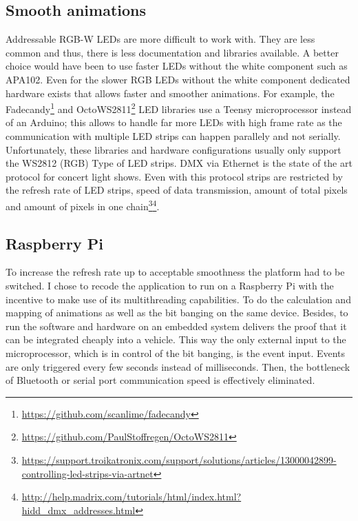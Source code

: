 \subsection{Smooth animations}
\label{ssec:smooth}
Addressable RGB-W LEDs are more difficult to work with. They are less common and thus, there is less documentation and libraries available. A better choice would have been to use faster LEDs without the white component such as APA102. Even for the slower RGB LEDs without the white component dedicated hardware exists that allows faster and smoother animations. For example, the Fadecandy\footnote{\url{https://github.com/scanlime/fadecandy}} and OctoWS2811\footnote{\url{https://github.com/PaulStoffregen/OctoWS2811}} LED libraries use a Teensy microprocessor instead of an Arduino; this allows to handle far more LEDs with high frame rate as the communication with multiple LED strips can happen parallely and not serially. Unfortunately, these libraries and hardware configurations usually only support the WS2812 (RGB) Type of LED strips. DMX via Ethernet is the state of the art protocol for concert light shows. Even with this protocol strips are restricted by the refresh rate of LED strips, speed of data transmission, amount of total pixels and amount of pixels in one chain\footnote{\url{https://support.troikatronix.com/support/solutions/articles/13000042899-controlling-led-strips-via-artnet}}\fnsep\footnote{\url{http://help.madrix.com/tutorials/html/index.html?hidd_dmx_addresses.html}}.  

\subsection{Raspberry Pi}
\label{ssec:raspberry}
To increase the refresh rate up to acceptable smoothness the platform had to be switched. I chose to recode the application to run on a Raspberry Pi with the incentive to make use of its multithreading capabilities. To do the calculation and mapping of animations as well as the bit banging on the same device. Besides, to run the software and hardware on an embedded system delivers the proof that it can be integrated cheaply into a vehicle. This way the only external input to the microprocessor, which is in control of the bit banging, is the event input. Events are only triggered every few seconds instead of milliseconds. Then, the bottleneck of Bluetooth or serial port communication speed is effectively eliminated. 

